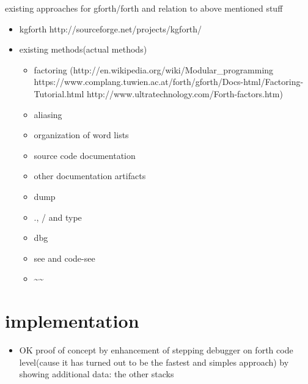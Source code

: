 \begin{itemize}
existing approaches for gforth/forth and relation to above mentioned stuff

\begin{itemize}
\item kgforth http://sourceforge.net/projects/kgforth/
\item existing methods(actual methods)
	\begin{itemize}
	\item factoring (http://en.wikipedia.org/wiki/Modular\_programming https://www.complang.tuwien.ac.at/forth/gforth/Docs-html/Factoring-Tutorial.html http://www.ultratechnology.com/Forth-factors.htm)
	\item aliasing
	\item organization of word lists
	\item source code documentation
	\item other documentation artifacts
	\item dump
	\item ., / and type
	\item dbg
	\item see and code-see
	\item \textasciitilde\textasciitilde
	\end{itemize}
\end{itemize}

\end{itemize}
	
\section{implementation}
\begin{itemize}
\item OK proof of concept by enhancement of stepping debugger on forth code level(cause it has turned out to be the fastest and simples approach) by showing additional data: the other stacks
\end{itemize}

